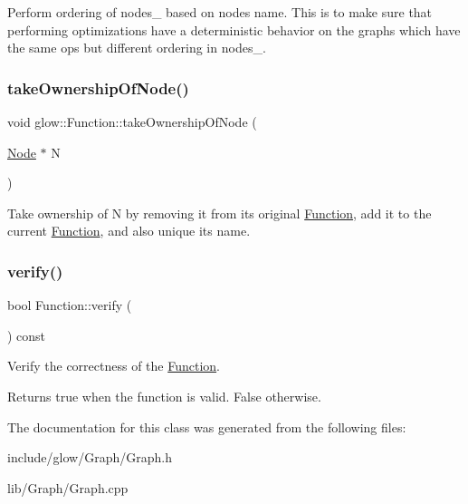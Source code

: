 Perform ordering of nodes\+\_\+ based on node\textquotesingle{}s name. This is to make sure that performing optimizations have a deterministic behavior on the graphs which have the same ops but different ordering in nodes\+\_\+. \mbox{\label{classglow_1_1_function_a74703c0bb968ca968b65dbc20653940c}} 
\subsubsection{\texorpdfstring{take\+Ownership\+Of\+Node()}{takeOwnershipOfNode()}}
{\footnotesize\ttfamily void glow\+::\+Function\+::take\+Ownership\+Of\+Node (\begin{DoxyParamCaption}\item[{\hyperlink{classglow_1_1_node}{Node} $\ast$}]{N }\end{DoxyParamCaption})\hspace{0.3cm}{\ttfamily [inline]}}

Take ownership of {\ttfamily N} by removing it from its original \hyperlink{classglow_1_1_function}{Function}, add it to the current \hyperlink{classglow_1_1_function}{Function}, and also unique its name. \mbox{\label{classglow_1_1_function_a73897a61138cf69eacb41357839815df}} 
\subsubsection{\texorpdfstring{verify()}{verify()}}
{\footnotesize\ttfamily bool Function\+::verify (\begin{DoxyParamCaption}{ }\end{DoxyParamCaption}) const}

Verify the correctness of the \hyperlink{classglow_1_1_function}{Function}. \begin{DoxyReturn}{Returns}
true when the function is valid. False otherwise. 
\end{DoxyReturn}


The documentation for this class was generated from the following files\+:\begin{DoxyCompactItemize}
\item 
include/glow/\+Graph/Graph.\+h\item 
lib/\+Graph/Graph.\+cpp\end{DoxyCompactItemize}
